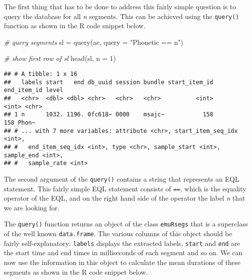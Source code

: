 \documentclass[
]{book}
\newenvironment{Shaded}{\begin{snugshade}}{\end{snugshade}}
\newcommand{\AttributeTok}[1]{\textcolor[rgb]{0.77,0.63,0.00}{#1}}
\newcommand{\CommentTok}[1]{\textcolor[rgb]{0.56,0.35,0.01}{\textit{#1}}}
\newcommand{\DecValTok}[1]{\textcolor[rgb]{0.00,0.00,0.81}{#1}}
\newcommand{\FunctionTok}[1]{\textcolor[rgb]{0.00,0.00,0.00}{#1}}
\newcommand{\NormalTok}[1]{#1}
\newcommand{\OtherTok}[1]{\textcolor[rgb]{0.56,0.35,0.01}{#1}}
\newcommand{\SpecialCharTok}[1]{\textcolor[rgb]{0.00,0.00,0.00}{#1}}
\newcommand{\StringTok}[1]{\textcolor[rgb]{0.31,0.60,0.02}{#1}}
\begin{document}
The first thing that has to be done to address this fairly simple question is to query the database for all \emph{n} segments. This can be achieved using the \texttt{query()} function as shown in the R code snippet below.

\begin{Shaded}
\begin{Highlighting}[]
\CommentTok{\# query segments}
\NormalTok{sl }\OtherTok{=} \FunctionTok{query}\NormalTok{(ae, }\AttributeTok{query =} \StringTok{"Phonetic == n"}\NormalTok{)}

\CommentTok{\# show first row of sl}
\FunctionTok{head}\NormalTok{(sl, }\AttributeTok{n =} \DecValTok{1}\NormalTok{)}
\end{Highlighting}
\end{Shaded}

\begin{verbatim}
## # A tibble: 1 x 16
##   labels start   end db_uuid session bundle start_item_id end_item_id level
##   <chr>  <dbl> <dbl> <chr>   <chr>   <chr>          <int>       <int> <chr>
## 1 n      1032. 1196. 0fc618~ 0000    msajc~           158         158 Phon~
## # ... with 7 more variables: attribute <chr>, start_item_seq_idx <int>,
## #   end_item_seq_idx <int>, type <chr>, sample_start <int>, sample_end <int>,
## #   sample_rate <int>
\end{verbatim}

The second argument of the \texttt{query()} contains a string that represents an EQL statement. This fairly simple EQL statement consists of \texttt{==}, which is the equality operator of the EQL, and on the right hand side of the operator the label \emph{n} that we are looking for.

The \texttt{query()} function returns an object of the class \texttt{emuRsegs} that is a superclass of the well known \texttt{data.frame}. The various columns of this object should be fairly self-explanatory: \texttt{labels} displays the extracted labels, \texttt{start} and \texttt{end} are the start time and end times in milliseconds of each segment and so on. We can now use the information in this object to calculate the mean durations of these segments as shown in the R code snippet below.

\begin{Shaded}
\end{Shaded}
\end{document}
